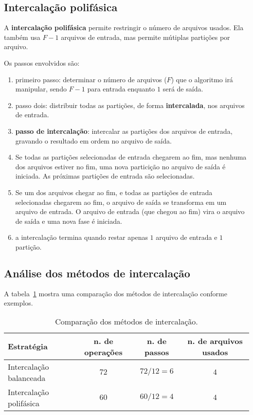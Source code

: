 \subsection{Intercalação polifásica}

A {\bf intercalação polifásica} permite restringir o número de arquivos usados.
Ela também usa $F-1$ arquivos de entrada, mas permite mútiplas partições por arquivo.

Os passos envolvidos são:
\begin{enumerate}
\item primeiro passo: determinar o número de arquivos ($F$) que o algoritmo irá
manipular, sendo $F-1$ para entrada enquanto $1$ será de saída.

\item passo dois: distribuir todas as partições, de forma {\bf intercalada},
nos arquivos de entrada.

\item {\bf passo de intercalação}: intercalar as partições dos arquivos de entrada,
gravando o resultado em ordem no arquivo de saída.

\item Se todas as partições selecionadas de entrada chegarem ao fim, 
mas nenhuma dos arquivos estiver no fim, uma nova particição no arquivo
de saída é iniciada.
As próximas partições de entrada são selecionadas.

\item Se um dos arquivos chegar ao fim, e todas as partições de entrada selecionadas
chegarem ao fim, o arquivo de saída se transforma em um arquivo de entrada.
O arquivo de entrada (que chegou ao fim) vira o arquivo de saída e uma nova fase é iniciada.

\item a intercalação termina quando restar apenas $1$ arquivo de entrada e 
$1$ partição.
\end{enumerate}

\subsection{Análise dos métodos de intercalação}

A tabela~\ref{aula04:tab:inter} mostra uma comparação dos métodos de intercalação
conforme exemplos.
%
\begin{table}[!ht]
\centering
\caption{Comparação dos métodos de intercalação.}
\begin{tabular}{l|c|c|c}
\hline
Estratégia & n. de operações & n. de passos & n. de arquivos usados \\ \hline
Intercalação balanceada & $72$ & $72/12 = 6$ & $4$ \\ \hline
Intercalação polifásica & $60$ & $60/12 = 4$ & $4$ \\ \hline
%
\end{tabular}
\label{aula04:tab:inter}
\end{table}

